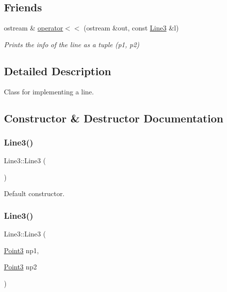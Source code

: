 \subsection*{Friends}
\begin{DoxyCompactItemize}
\item 
ostream \& \mbox{\hyperlink{class_line3_a53d0a02d7be615c434c58c0779c3cc42}{operator$<$$<$}} (ostream \&out, const \mbox{\hyperlink{class_line3}{Line3}} \&l)
\begin{DoxyCompactList}\small\item\em Prints the info of the line as a tuple (p1, p2) \end{DoxyCompactList}\end{DoxyCompactItemize}


\subsection{Detailed Description}
Class for implementing a line. 

\subsection{Constructor \& Destructor Documentation}
\mbox{\label{class_line3_aa137ee7a270002e5d601df5d5a370c7f}} 
\subsubsection{\texorpdfstring{Line3()}{Line3()}\hspace{0.1cm}{\footnotesize\ttfamily [1/2]}}
{\footnotesize\ttfamily Line3\+::\+Line3 (\begin{DoxyParamCaption}{ }\end{DoxyParamCaption})}



Default constructor. 

\mbox{\label{class_line3_a2eedc060f2b071305bfb30a087c528bf}} 
\subsubsection{\texorpdfstring{Line3()}{Line3()}\hspace{0.1cm}{\footnotesize\ttfamily [2/2]}}
{\footnotesize\ttfamily Line3\+::\+Line3 (\begin{DoxyParamCaption}\item[{\mbox{\hyperlink{class_point3}{Point3}}}]{np1,  }\item[{\mbox{\hyperlink{class_point3}{Point3}}}]{np2 }\end{DoxyParamCaption})}



